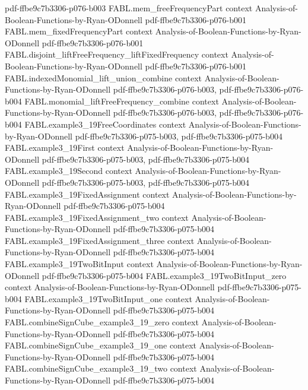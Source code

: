 \begin{theorem}
{    pdf-ffbe9c7b3306-p076-b003}
\proofstep
  {FABL.mem_freeFrequencyPart}
  {context}
  {Analysis-of-Boolean-Functions-by-Ryan-ODonnell}
  {pdf-ffbe9c7b3306-p076-b001}
\proofstep
  {FABL.mem_fixedFrequencyPart}
  {context}
  {Analysis-of-Boolean-Functions-by-Ryan-ODonnell}
  {pdf-ffbe9c7b3306-p076-b001}
\proofstep
  {FABL.disjoint_liftFreeFrequency_liftFixedFrequency}
  {context}
  {Analysis-of-Boolean-Functions-by-Ryan-ODonnell}
  {pdf-ffbe9c7b3306-p076-b001}
\proofstep
  {FABL.indexedMonomial_lift_union_combine}
  {context}
  {Analysis-of-Boolean-Functions-by-Ryan-ODonnell}
  {pdf-ffbe9c7b3306-p076-b003,
    pdf-ffbe9c7b3306-p076-b004}
\proofstep
  {FABL.monomial_liftFreeFrequency_combine}
  {context}
  {Analysis-of-Boolean-Functions-by-Ryan-ODonnell}
  {pdf-ffbe9c7b3306-p076-b003,
    pdf-ffbe9c7b3306-p076-b004}
\proofstep
  {FABL.example3_19FreeCoordinates}
  {context}
  {Analysis-of-Boolean-Functions-by-Ryan-ODonnell}
  {pdf-ffbe9c7b3306-p075-b003,
    pdf-ffbe9c7b3306-p075-b004}
\proofstep
  {FABL.example3_19First}
  {context}
  {Analysis-of-Boolean-Functions-by-Ryan-ODonnell}
  {pdf-ffbe9c7b3306-p075-b003,
    pdf-ffbe9c7b3306-p075-b004}
\proofstep
  {FABL.example3_19Second}
  {context}
  {Analysis-of-Boolean-Functions-by-Ryan-ODonnell}
  {pdf-ffbe9c7b3306-p075-b003,
    pdf-ffbe9c7b3306-p075-b004}
\proofstep
  {FABL.example3_19FixedAssignment}
  {context}
  {Analysis-of-Boolean-Functions-by-Ryan-ODonnell}
  {pdf-ffbe9c7b3306-p075-b004}
\proofstep
  {FABL.example3_19FixedAssignment_two}
  {context}
  {Analysis-of-Boolean-Functions-by-Ryan-ODonnell}
  {pdf-ffbe9c7b3306-p075-b004}
\proofstep
  {FABL.example3_19FixedAssignment_three}
  {context}
  {Analysis-of-Boolean-Functions-by-Ryan-ODonnell}
  {pdf-ffbe9c7b3306-p075-b004}
\proofstep
  {FABL.example3_19TwoBitInput}
  {context}
  {Analysis-of-Boolean-Functions-by-Ryan-ODonnell}
  {pdf-ffbe9c7b3306-p075-b004}
\proofstep
  {FABL.example3_19TwoBitInput_zero}
  {context}
  {Analysis-of-Boolean-Functions-by-Ryan-ODonnell}
  {pdf-ffbe9c7b3306-p075-b004}
\proofstep
  {FABL.example3_19TwoBitInput_one}
  {context}
  {Analysis-of-Boolean-Functions-by-Ryan-ODonnell}
  {pdf-ffbe9c7b3306-p075-b004}
\proofstep
  {FABL.combineSignCube_example3_19_zero}
  {context}
  {Analysis-of-Boolean-Functions-by-Ryan-ODonnell}
  {pdf-ffbe9c7b3306-p075-b004}
\proofstep
  {FABL.combineSignCube_example3_19_one}
  {context}
  {Analysis-of-Boolean-Functions-by-Ryan-ODonnell}
  {pdf-ffbe9c7b3306-p075-b004}
\proofstep
  {FABL.combineSignCube_example3_19_two}
  {context}
  {Analysis-of-Boolean-Functions-by-Ryan-ODonnell}
  {pdf-ffbe9c7b3306-p075-b004}

\end{theorem}
